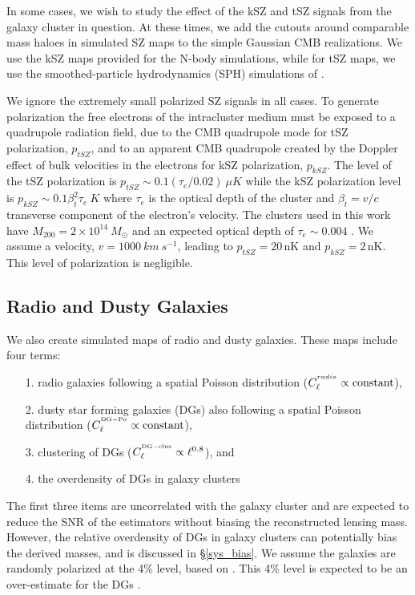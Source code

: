 In some cases, we wish to study the effect of the kSZ and tSZ signals from the galaxy cluster in question. %
At these times, we add the cutouts around comparable mass haloes in simulated SZ maps to the simple Gaussian CMB realizations. We use the kSZ maps provided for the \citet{flender16} N-body simulations, while for tSZ maps, we use the smoothed-particle hydrodynamics (SPH) simulations of  \citet{mccarthy13}. 

We ignore the extremely small polarized SZ signals in all cases. To generate polarization the free electrons of the intracluster medium must be exposed to a quadrupole radiation field, due to the CMB quadrupole mode for tSZ polarization, $p_{tSZ}$, and to an apparent CMB quadrupole created by the Doppler effect of bulk velocities in the electrons for kSZ polarization, $p_{kSZ}$. The level of the tSZ polarization is $p_{tSZ} \sim 0.1 (\tau_{e}/0.02)\ \mu K$ while the kSZ polarization level is $p_{kSZ} \sim 0.1 \beta_{t}^{2}\tau_{e}\ K$ \citep{sazonov99, carlstrom02} where $\tau_{e}$ is the optical depth of the cluster and $\beta_{t} = v/c$ transverse component of the electron's velocity. The clusters used in this work have $M_{200} =  2 \times 10^{14}\ M_{\odot}$ and an expected optical depth of $\tau_{e} \sim 0.004$ \citep{flender16}. 
We assume a velocity, $v = 1000\ km\ s^{-1}$, leading to $p_{tSZ}=20$\,nK and $p_{kSZ} =2$\,nK. This level of polarization is negligible.

\subsection{Radio and Dusty Galaxies}
\label{sec_appendix_extragal}

We also create simulated maps of radio and dusty galaxies. 
These maps include four terms: 
\begin{enumerate}
\item[1.] radio galaxies following a spatial Poisson distribution ($C_{\ell}^{^{radio}} \propto {\rm constant}$),
\item[2.] dusty star forming galaxies (DGs) also following a spatial Poisson distribution ($C_{\ell}^{^{\rm DG-Po}} \propto {\rm constant}$),
\item[3.] clustering of DGs ($C_{\ell}^{^{\rm DG-clus}} \propto  \ell^{0.8}$), and 
\item[4.] the overdensity of DGs in galaxy clusters
\end{enumerate} 
The first three items are uncorrelated with the galaxy cluster and are expected to reduce the SNR of the estimators without biasing the reconstructed lensing mass. However, the relative overdensity of DGs in galaxy clusters can potentially bias the derived masses, and is discussed  in \S\ref{sys_bias}. We assume the galaxies are randomly polarized at the 4\% level, based on \citet{manzotti17}. This 4\% level is expected to be an over-estimate for the DGs \citep{seiffert07}. 

